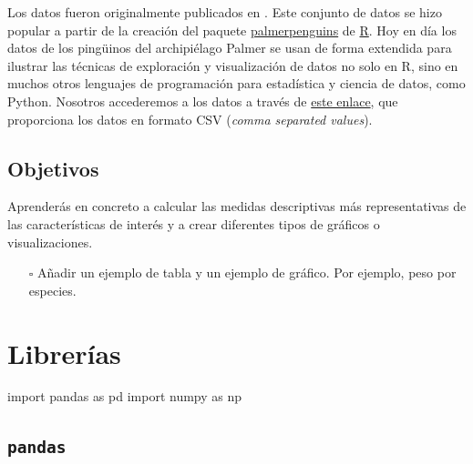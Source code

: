 \documentclass[
  a4paper,
  noprof,
  12pt,
  notoc,
  nosols,
  nobib]{mnye}
\newenvironment{Shaded}{\begin{snugshade}}{\end{snugshade}}
\newcommand{\ImportTok}[1]{\textcolor[rgb]{0.00,0.46,0.62}{#1}}
\newcommand{\NormalTok}[1]{\textcolor[rgb]{0.00,0.23,0.31}{#1}}
\providecommand{\tightlist}{%
  \setlength{\itemsep}{0pt}\setlength{\parskip}{0pt}}\usepackage{longtable,booktabs,array}
\theoremstyle{definition}
\theoremstyle{remark}
\begin{document}
Los datos fueron originalmente publicados en \textcite{Gorman2014}. Este
conjunto de datos se hizo popular a partir de la creación del paquete
\href{https://github.com/allisonhorst/palmerpenguins}{palmerpenguins} de
\href{https://www.r-project.org/}{R}. Hoy en día los datos de los
pingüinos del archipiélago Palmer se usan de forma extendida para
ilustrar las técnicas de exploración y visualización de datos no solo en
R, sino en muchos otros lenguajes de programación para estadística y
ciencia de datos, como Python. Nosotros accederemos a los datos a través
de
\href{https://github.com/mwaskom/seaborn-data/blob/master/penguins.csv}{este
enlace}, que proporciona los datos en formato CSV (\emph{comma separated
values}).

\hypertarget{objetivos}{%
\subsection*{Objetivos}\label{objetivos}}


Aprenderás en concreto a calcular las medidas descriptivas más
representativas de las características de interés y a crear diferentes
tipos de gráficos o visualizaciones.

\begin{itemize}
\tightlist
\item[$\square$]
  Añadir un ejemplo de tabla y un ejemplo de gráfico. Por ejemplo, peso
  por especies.
\end{itemize}


\hypertarget{libreruxedas}{%
\section{Librerías}\label{libreruxedas}}

\begin{Shaded}
\begin{Highlighting}[]
\ImportTok{import}\NormalTok{ pandas }\ImportTok{as}\NormalTok{ pd}
\ImportTok{import}\NormalTok{ numpy }\ImportTok{as}\NormalTok{ np}
\end{Highlighting}
\end{Shaded}

\hypertarget{pandas}{%
\subsection{\texorpdfstring{\texttt{pandas}}{pandas}}\label{pandas}}
\end{document}
